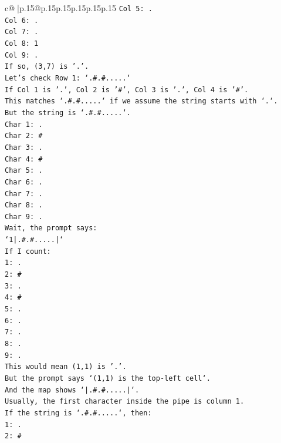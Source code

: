 \documentclass{article}
\begin{document}
{\begin{supertabular}{c@{$\;$}|p{.15\linewidth}@{}p{.15\linewidth}p{.15\linewidth}p{.15\linewidth}p{.15\linewidth}p{.15\linewidth}}
{{{\texttt{Col 5: .} \\
\texttt{Col 6: .} \\
\texttt{Col 7: .} \\
\texttt{Col 8: 1} \\
\texttt{Col 9: .} \\
\texttt{If so, (3,7) is '.'.} \\
\texttt{Let's check Row 1: `.\#.\#.....`} \\
\texttt{If Col 1 is '.', Col 2 is '\#', Col 3 is '.', Col 4 is '\#'.} \\
\texttt{This matches `.\#.\#.....` if we assume the string starts with `.`.} \\
\texttt{But the string is `.\#.\#.....`.} \\
\texttt{Char 1: .} \\
\texttt{Char 2: \#} \\
\texttt{Char 3: .} \\
\texttt{Char 4: \#} \\
\texttt{Char 5: .} \\
\texttt{Char 6: .} \\
\texttt{Char 7: .} \\
\texttt{Char 8: .} \\
\texttt{Char 9: .} \\
\texttt{Wait, the prompt says:} \\
\texttt{`1|.\#.\#.....|`} \\
\texttt{If I count:} \\
\texttt{1: .} \\
\texttt{2: \#} \\
\texttt{3: .} \\
\texttt{4: \#} \\
\texttt{5: .} \\
\texttt{6: .} \\
\texttt{7: .} \\
\texttt{8: .} \\
\texttt{9: .} \\
\texttt{This would mean (1,1) is '.'.} \\
\texttt{But the prompt says `(1,1) is the top{-}left cell`.} \\
\texttt{And the map shows `|.\#.\#.....|`.} \\
\texttt{Usually, the first character inside the pipe is column 1.} \\
\texttt{If the string is `.\#.\#.....`, then:} \\
\texttt{1: .} \\
\texttt{2: \#} \\
}}}
\end{supertabular}}
\end{document}
